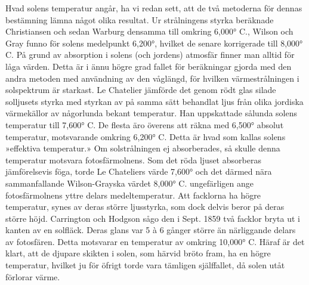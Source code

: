 \documentclass[a4paper, 12pt, oneside, swedish]{article}
\begin{document}
Hvad solens temperatur angår, ha vi redan sett, att de två metoderna för dennas bestämning lämna något olika resultat. Ur strålningens styrka beräknade Christiansen och sedan Warburg densamma till omkring 6,000° C., Wilson och Gray funno för solens medelpunkt 6,200°, hvilket de senare korrigerade till 8,000° C. På grund av absorption i solens (och jordens) atmosfär finner man alltid för låga värden. Detta är i ännu högre grad fallet för beräkningar gjorda med den andra metoden med användning av den våglängd, för hvilken värmestrålningen i solspektrum är starkast. Le Chatelier jämförde det genom rödt glas silade solljusets styrka med styrkan av på samma sätt behandlat ljus från olika jordiska värmekällor av någorlunda bekant temperatur. Han uppskattade sålunda solens temperatur till 7,600° C. De flesta äro överens att räkna med 6,500° absolut temperatur, motsvarande omkring 6,200° C. Detta är hvad som kallas solens »effektiva temperatur.» Om solstrålningen ej absorberades, så skulle denna temperatur motsvara fotosfärmolnens. Som det röda ljuset absorberas jämförelsevis föga, torde Le Chateliers värde 7,600° och det därmed nära sammanfallande Wilson-Grayska värdet 8,000° C. ungefärligen ange fotosfärmolnens yttre delars medeltemperatur. Att facklorna ha högre temperatur, synes av deras större ljusstyrka, som dock delvis beror på deras större höjd. Carrington och Hodgson sågo den i Sept. 1859 två facklor bryta ut i kanten av en solfläck. Deras glans var 5 à 6 gånger större än närliggande delars av fotosfären. Detta motsvarar en temperatur av omkring 10,000° C. Häraf är det klart, att de djupare skikten i solen, som härvid bröto fram, ha en högre temperatur, hvilket ju för öfrigt torde vara tämligen själffallet, då solen utåt förlorar värme.
\end{document}
